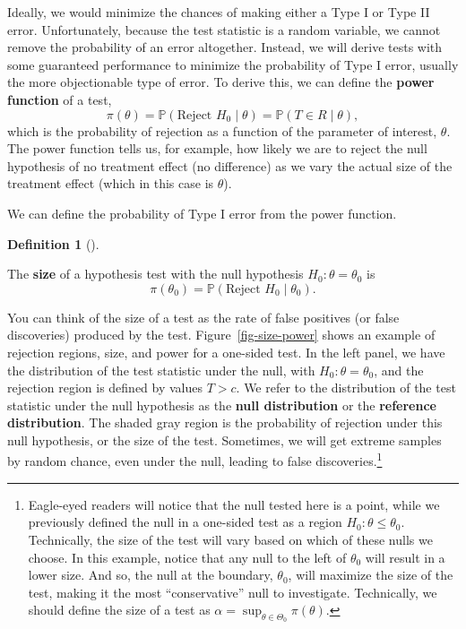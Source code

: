 \documentclass[
  letterpaper,
  DIV=11,
  numbers=noendperiod]{scrreprt}
\renewcommand{\P}{\mathbb{P}}
\theoremstyle{definition}
\theoremstyle{definition}
\newtheorem{definition}{Definition}[chapter]
\theoremstyle{plain}
\theoremstyle{remark}
\begin{document}
Ideally, we would minimize the chances of making either a Type I or Type
II error. Unfortunately, because the test statistic is a random
variable, we cannot remove the probability of an error altogether.
Instead, we will derive tests with some guaranteed performance to
minimize the probability of Type I error, usually the more objectionable
type of error. To derive this, we can define the \textbf{power function}
of a test, \[ 
\pi(\theta) = \P\left( \text{Reject } H_0 \mid \theta \right) = \P\left( T \in R \mid \theta \right),
\] which is the probability of rejection as a function of the parameter
of interest, \(\theta\). The power function tells us, for example, how
likely we are to reject the null hypothesis of no treatment effect (no
difference) as we vary the actual size of the treatment effect (which in
this case is \(\theta\)).

We can define the probability of Type I error from the power function.

\begin{definition}[]\protect\hypertarget{def-size}{}\label{def-size}

The \textbf{size} of a hypothesis test with the null hypothesis
\(H_0: \theta = \theta_0\) is \[ 
\pi(\theta_0) = \P\left( \text{Reject } H_0 \mid \theta_0 \right).
\]

\end{definition}

You can think of the size of a test as the rate of false positives (or
false discoveries) produced by the test. Figure~\ref{fig-size-power}
shows an example of rejection regions, size, and power for a one-sided
test. In the left panel, we have the distribution of the test statistic
under the null, with \(H_0: \theta = \theta_0\), and the rejection
region is defined by values \(T > c\). We refer to the distribution of
the test statistic under the null hypothesis as the \textbf{null
distribution} or the \textbf{reference distribution}. The shaded gray
region is the probability of rejection under this null hypothesis, or
the size of the test. Sometimes, we will get extreme samples by random
chance, even under the null, leading to false discoveries.\footnote{Eagle-eyed
  readers will notice that the null tested here is a point, while we
  previously defined the null in a one-sided test as a region
  \(H_0: \theta \leq \theta_0\). Technically, the size of the test will
  vary based on which of these nulls we choose. In this example, notice
  that any null to the left of \(\theta_0\) will result in a lower size.
  And so, the null at the boundary, \(\theta_0\), will maximize the size
  of the test, making it the most ``conservative'' null to investigate.
  Technically, we should define the size of a test as
  \(\alpha = \sup_{\theta \in \Theta_0} \pi(\theta)\).}
\end{document}
